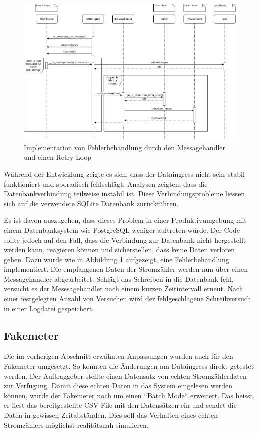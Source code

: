 \begin{figure}[H]
    \centering
    \includegraphics[width=1.0\textwidth]{gfx/dataingress-sequence}
    \caption{
        Implementation von Fehlerbehandlung durch den Messagehandler und einen
        Retry-Loop
    }
    \label{fig:dataingress-sequence}
\end{figure}

Während der Entwicklung zeigte es sich, dass der Dataingress nicht sehr stabil
funktioniert und sporadisch fehlschlägt. Analysen zeigten, dass
die Datenbankverbindung teilweise instabil ist.
Diese Verbindungsprobleme liessen sich auf die verwendete SQLite Datenbank zurückführen.

Es ist davon auszugehen, dass dieses Problem in einer Produktivumgebung mit einem Datenbanksystem wie PostgreSQL
weniger auftreten würde.
Der Code sollte jedoch auf den Fall, dass die Verbindung zur Datenbank nicht hergestellt werden kann, reagieren können
und sicherstellen, dass keine Daten verloren gehen.
Dazu wurde wie in Abbildung \ref{fig:dataingress-sequence} aufgezeigt,
eine Fehlerbehandlung implementiert.
Die empfangenen Daten der Stromzähler
werden nun über einen Messagehandler abgearbeitet.
Schlägt das Schreiben in die Datenbank fehl, versucht es der Messsagehandler nach einem kurzen Zeitintervall erneut.
Nach einer festgelegten Anzahl von Versuchen wird der fehlgeschlagene Schreibversuch in einer Logdatei gespeichert.

\subsection{Fakemeter}
Die im vorherigen Abschnitt erwähnten Anpassungen wurden auch für den Fakemeter umgesetzt.
So konnten die Änderungen am Dataingress direkt getestet werden. 
Der Auftraggeber stellte einen Datensatz von echten Stromzählerdaten
zur Verfügung. Damit diese echten Daten in das System eingelesen werden können,
wurde der Fakemeter noch um einen ``Batch Mode`` erweitert. Das heisst,
er liest das bereitgestellte CSV File mit den Datensätzen ein und sendet die Daten in
gewissen Zeitabständen. Dies soll das Verhalten eines echten Stromzählers
möglichst realitätsnah simulieren. 

